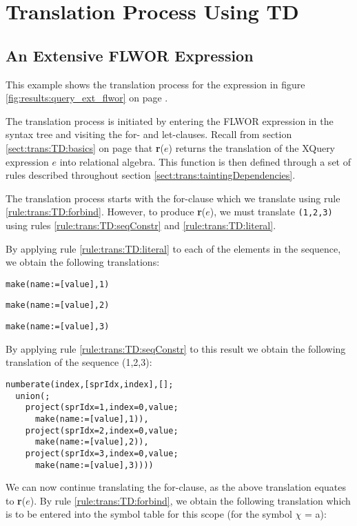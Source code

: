 \chapter{Translation Process Using TD}
\label{appendix:transl}
\section{An Extensive FLWOR Expression}
\label{appendix:transl:ext_flwor}
This example shows the translation process for the expression in figure
\ref{fig:results:query_ext_flwor} on page \pageref{fig:results:query_ext_flwor}.

The translation process is initiated by entering the FLWOR expression in the
syntax tree and visiting the for- and let-clauses. Recall from section
\ref{sect:trans:TD:basics} on page \pageref{sect:trans:TD:basics} that
\textbf{r}($e$) returns the translation of the XQuery expression $e$ into
relational algebra. This function is then defined through a set of rules
described throughout section \ref{sect:trans:taintingDependencies}.

The translation process starts with the for-clause which we translate using
rule \ref{rule:trans:TD:forbind}. However, to produce \textbf{r}($e$), we must
translate \texttt{(1,2,3)} using rules \ref{rule:trans:TD:seqConstr} and
\ref{rule:trans:TD:literal}. 

By applying rule \ref{rule:trans:TD:literal} to each of the elements in the
sequence, we obtain the following translations:
\begin{Verbatim}
make(name:=[value],1)
\end{Verbatim}
\begin{Verbatim}
make(name:=[value],2)
\end{Verbatim}
\begin{Verbatim}
make(name:=[value],3)
\end{Verbatim}

By applying rule \ref{rule:trans:TD:seqConstr} to this result we obtain the
following translation of the sequence (1,2,3):

\begin{Verbatim}
numberate(index,[sprIdx,index],[];
  union(;
    project(sprIdx=1,index=0,value;
      make(name:=[value],1)),
    project(sprIdx=2,index=0,value;
      make(name:=[value],2)),
    project(sprIdx=3,index=0,value;
      make(name:=[value],3))))
\end{Verbatim}

We can now continue translating the for-clause, as the above translation
equates to \textbf{r}($e$). By rule \ref{rule:trans:TD:forbind}, we obtain the
following translation which is to be entered into the symbol table for this
scope (for the symbol $\chi$ = a):

